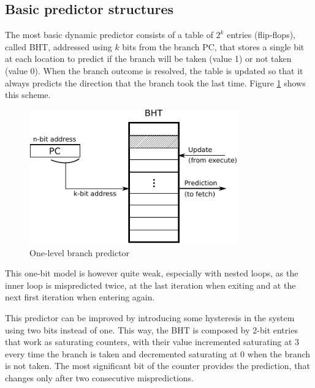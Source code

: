 \subsection{Basic predictor structures}
The most basic dynamic predictor consists of a table of $2^k$ entries (flip-flops), called \ac{BHT}, addressed using $k$ bits from the branch \ac{PC}, that stores a single bit at each location to predict if the branch will be taken (value 1) or not taken (value 0). When the branch outcome is resolved, the table is updated so that it always predicts the direction that the branch took the last time. Figure \ref{fig:one-level-bp} shows this scheme.
\begin{figure}[hbtp]
  \centering
  \includegraphics[width=0.8\textwidth]{img/one-level-bp.pdf}
  \caption[One-level branch predictor]{One-level branch predictor\footnotemark}
  \label{fig:one-level-bp}
\end{figure}

This one-bit model is however quite weak, especially with nested loops, as the inner loop is mispredicted twice, at the last iteration when exiting and at the next first iteration when entering again.

This predictor can be improved by introducing some hysteresis in the system using two bits instead of one. This way, the \ac{BHT} is composed by 2-bit entries that work as saturating counters, with their value incremented saturating at 3 every time the branch is taken and decremented saturating at 0 when the branch is not taken. The most significant bit of the counter provides the prediction, that changes only after two consecutive mispredictions. 

